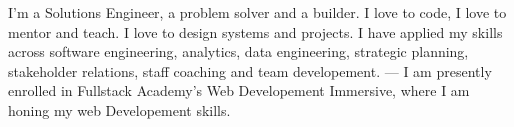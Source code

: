 
\begin{cvsummary}
  \summary
    {I'm a Solutions Engineer, a problem solver and a builder. I love to code, I love to mentor and teach. I love to design systems and projects. I have applied my skills across software engineering, analytics, data engineering, strategic planning, stakeholder relations, staff coaching and team developement. --- I am presently enrolled in Fullstack Academy's Web Developement Immersive, where I am honing my web Developement skills.  
    }
\end{cvsummary}
